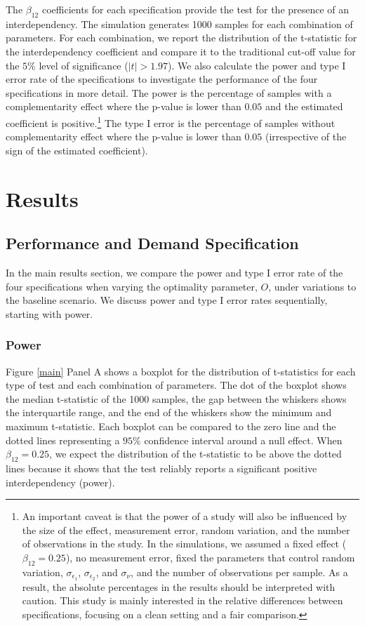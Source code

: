 \documentclass[12pt]{article}
\begin{document}
The $\beta_{12}$ coefficients for each specification provide the test for the presence of an interdependency. The simulation generates 1000 samples for each combination of parameters. For each combination, we report the distribution of the t-statistic for the interdependency coefficient and compare it to the traditional cut-off value for the $5\%$ level of significance ($|t| > 1.97$). We also calculate the power and type I error rate of the specifications to investigate the performance of the four specifications in more detail. The power is the percentage of samples with a complementarity effect where the p-value is lower than $0.05$ and the estimated coefficient is positive.\footnote{An important caveat is that the power of a study will also be influenced by the size of the effect, measurement error, random variation, and the number of observations in the study. In the simulations, we assumed a fixed effect ($\beta_{12} = 0.25$), no measurement error, fixed the parameters that control random variation, $\sigma_{\epsilon_1}$, $\sigma_{\epsilon_2}$, and $\sigma_{\nu}$, and the number of observations per sample. As a result, the absolute percentages in the results should be interpreted with caution. This study is mainly interested in the relative differences between specifications, focusing on a clean setting and a fair comparison.} The type I error is the percentage of samples without complementarity effect where the p-value is lower than $0.05$ (irrespective of the sign of the estimated coefficient). 

\section{Results}
\subsection{Performance and Demand Specification}\label{performance-and-demand-function-approach}

In the main results section, we compare the power and type I error rate of the four specifications when varying the optimality parameter, $O$, under variations to the baseline scenario. We discuss power and type I error rates sequentially, starting with power.

\subsubsection{Power}\label{Power}
Figure \ref{main} Panel A shows a boxplot for the distribution of t-statistics for each type of test and each combination of parameters. The dot of the boxplot shows the median t-statistic of the 1000 samples, the gap between the whiskers shows the interquartile range, and the end of the whiskers show the minimum and maximum t-statistic. Each boxplot can be compared to the zero line and the dotted lines representing a $95\%$ confidence interval around a null effect. When $\beta_{12} = 0.25$, we expect the distribution of the t-statistic to be above the dotted lines because it shows that the test reliably reports a significant positive interdependency (power).  
\end{document}
